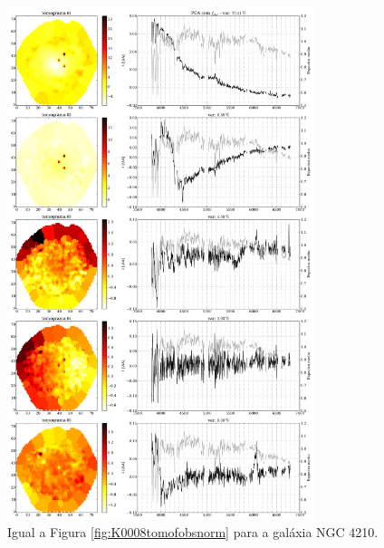 \begin{figure}
    \includegraphics[width=0.8\textwidth]{figuras/K0518-tomo-obs-norm.pdf}
    \caption[Tomogramas de 1 a 5 para o cubo $f_{obs}$ - NGC 4210.]
    {Igual a Figura \ref{fig:K0008tomofobsnorm} para a galáxia NGC 4210.}
    \label{fig:K0518tomofobsnorm}
\end{figure}

